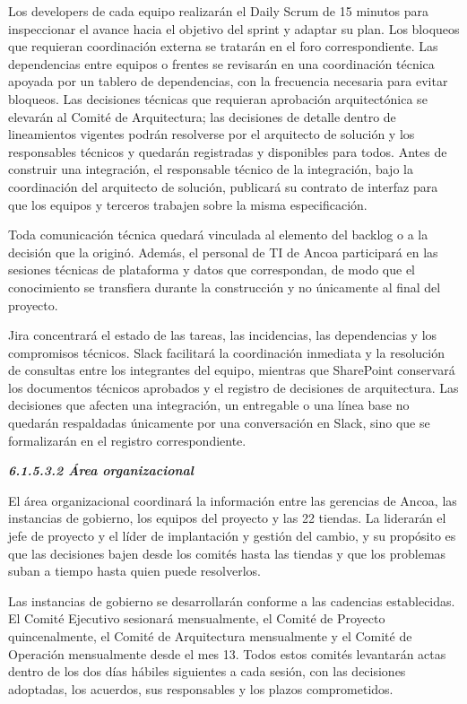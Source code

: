 \documentclass[11pt]{article}
\begin{document}
Los developers de cada equipo realizarán el Daily Scrum de 15 minutos
para inspeccionar el avance hacia el objetivo del sprint y adaptar su
plan. Los bloqueos que requieran coordinación externa se tratarán en el
foro correspondiente. Las dependencias entre equipos o frentes se
revisarán en una coordinación técnica apoyada por un tablero de
dependencias, con la frecuencia necesaria para evitar bloqueos. Las
decisiones técnicas que requieran aprobación arquitectónica se elevarán
al Comité de Arquitectura; las decisiones de detalle dentro de
lineamientos vigentes podrán resolverse por el arquitecto de solución y
los responsables técnicos y quedarán registradas y disponibles para
todos. Antes de construir una integración, el responsable técnico de la
integración, bajo la coordinación del arquitecto de solución, publicará
su contrato de interfaz para que los equipos y terceros trabajen sobre
la misma especificación.

Toda comunicación técnica quedará vinculada al elemento del backlog o a
la decisión que la originó. Además, el personal de TI de Ancoa
participará en las sesiones técnicas de plataforma y datos que
correspondan, de modo que el conocimiento se transfiera durante la
construcción y no únicamente al final del proyecto.

Jira concentrará el estado de las tareas, las incidencias, las
dependencias y los compromisos técnicos. Slack facilitará la
coordinación inmediata y la resolución de consultas entre los
integrantes del equipo, mientras que SharePoint conservará los
documentos técnicos aprobados y el registro de decisiones de
arquitectura. Las decisiones que afecten una integración, un entregable
o una línea base no quedarán respaldadas únicamente por una conversación
en Slack, sino que se formalizarán en el registro correspondiente.

\emph{\textbf{6.1.5.3.2 Área organizacional}}

El área organizacional coordinará la información entre las gerencias de
Ancoa, las instancias de gobierno, los equipos del proyecto y las 22
tiendas. La liderarán el jefe de proyecto y el líder de implantación y
gestión del cambio, y su propósito es que las decisiones bajen desde los
comités hasta las tiendas y que los problemas suban a tiempo hasta quien
puede resolverlos.

Las instancias de gobierno se desarrollarán conforme a las cadencias
establecidas. El Comité Ejecutivo sesionará mensualmente, el Comité de
Proyecto quincenalmente, el Comité de Arquitectura mensualmente y el
Comité de Operación mensualmente desde el mes 13. Todos estos comités
levantarán actas dentro de los dos días hábiles siguientes a cada
sesión, con las decisiones adoptadas, los acuerdos, sus responsables y
los plazos comprometidos.
\end{document}
